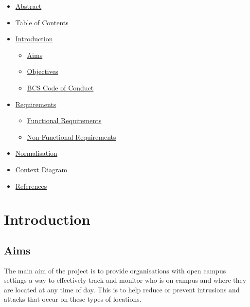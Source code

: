 \documentclass[
  english,
  a4paper,
,tablecaptionabove
]{scrartcl}
\providecommand{\tightlist}{%
  \setlength{\itemsep}{0pt}\setlength{\parskip}{0pt}}
\begin{document}
\begin{itemize}
\tightlist
\item
  \protect\hyperlink{abstract}{Abstract}
\item
  \protect\hyperlink{table-of-contents}{Table of Contents}
\item
  \protect\hyperlink{introduction}{Introduction}

  \begin{itemize}
  \tightlist
  \item
    \protect\hyperlink{aims}{Aims}
  \item
    \protect\hyperlink{objectives}{Objectives}
  \item
    \protect\hyperlink{bcs-code-of-conduct}{BCS Code of Conduct}
  \end{itemize}
\item
  \protect\hyperlink{requirements}{Requirements}

  \begin{itemize}
  \tightlist
  \item
    \protect\hyperlink{functional-requirements}{Functional Requirements}
  \item
    \protect\hyperlink{non-functional-requirements}{Non-Functional
    Requirements}
  \end{itemize}
\item
  \protect\hyperlink{normalisation}{Normalisation}
\item
  \protect\hyperlink{context-diagram}{Context Diagram}
\item
  \protect\hyperlink{references}{References}
\end{itemize}

\newpage

\hypertarget{introduction}{%
\section{Introduction}\label{introduction}}

\hypertarget{aims}{%
\subsection{Aims}\label{aims}}

The main aim of the project is to provide organisations with open campus
settings a way to effectively track and monitor who is on campus and
where they are located at any time of day. This is to help reduce or
prevent intrusions and attacks that occur on these types of locations.
\end{document}
